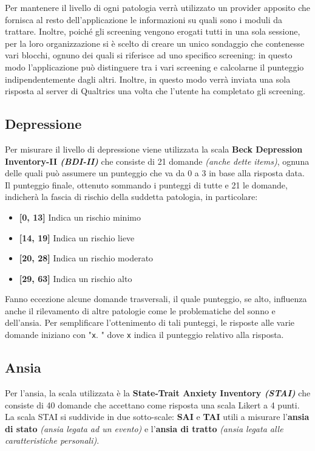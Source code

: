Per mantenere il livello di ogni patologia verrà utilizzato un provider apposito che fornisca al resto dell'applicazione le informazioni su quali sono i moduli da trattare.
Inoltre, poiché gli screening vengono erogati tutti in una sola sessione, per la loro organizzazione si è scelto di creare un unico sondaggio che contenesse vari blocchi, ognuno dei quali si riferisce ad uno specifico screening: in questo modo l'applicazione può distinguere tra i vari screening e calcolarne il punteggio indipendentemente dagli altri. Inoltre, in questo modo verrà inviata una sola risposta al server di Qualtrics una volta che l'utente ha completato gli screening.

\subsection{Depressione}
Per misurare il livello di depressione viene utilizzata la scala \textbf{Beck Depression Inventory-II \textit{(BDI-II)}}\cite{BDI-II} che consiste di 21 domande \textit{(anche dette items)}, ognuna delle quali può assumere un punteggio che va da 0 a 3 in base alla risposta data.
Il punteggio finale, ottenuto sommando i punteggi di tutte e 21 le domande, indicherà la fascia di rischio della suddetta patologia, in particolare:
\begin{itemize}
\item \textbf{[0, 13]} Indica un rischio minimo
\item \textbf{[14, 19]} Indica un rischio lieve
\item \textbf{[20, 28]} Indica un rischio moderato
\item \textbf{[29, 63]} Indica un rischio alto
\end{itemize}

Fanno eccezione alcune domande trasversali, il quale punteggio, se alto, influenza anche il rilevamento di altre patologie come le problematiche del sonno e dell'ansia.
Per semplificare l'ottenimento di tali punteggi, le risposte alle varie domande iniziano con "\texttt{x}. " dove \texttt{x} indica il punteggio relativo alla risposta.

\subsection{Ansia}
Per l'ansia, la scala utilizzata è la \textbf{State-Trait  Anxiety Inventory \textit{(STAI)}}\cite{STAI} che consiste di 40 domande che accettano come risposta una scala Likert a 4 punti. La scala STAI si suddivide in due sotto-scale: \textbf{SAI} e \textbf{TAI} utili a misurare l'\textbf{ansia di stato} \textit{(ansia legata ad un evento)} e l'\textbf{ansia di tratto} \textit{(ansia legata alle caratteristiche personali)}.

